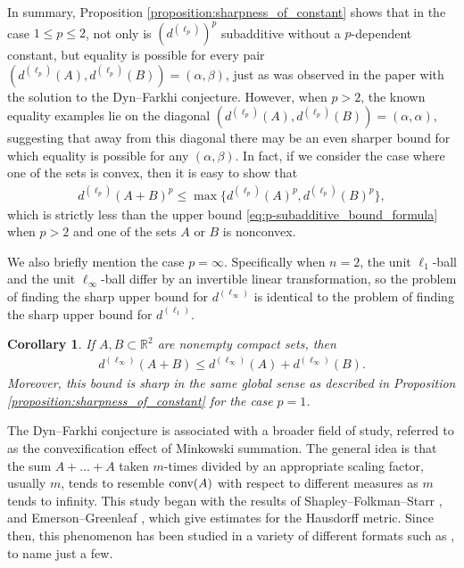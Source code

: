 \documentclass[11pt]{article}
\newtheorem{corollary}{Corollary}[section]
\begin{document}
In summary, Proposition \ref{proposition:sharpness_of_constant} shows that in the case $1\leq p\leq 2$, not only is $(d^{(\ell_p)})^p$ subadditive without a $p$-dependent constant, but equality is possible for every pair $(d^{(\ell_p)}(A),d^{(\ell_p)}(B))=(\alpha,\beta)$, just as was observed in the paper \cite{meyer2} with the solution to the Dyn--Farkhi conjecture. However, when $p>2$, the known equality examples lie on the diagonal $(d^{(\ell_p)}(A),d^{(\ell_p)}(B))=(\alpha,\alpha)$, suggesting that away from this diagonal there may be an even sharper bound for which equality is possible for any $(\alpha,\beta)$. In fact, if we consider the case where one of the sets is convex, then it is easy to show that 
\begin{align*}
    d^{(\ell_p)}(A+B)^p\leq \max\{d^{(\ell_p)}(A)^p,d^{(\ell_p)}(B)^p\},
\end{align*}
which is strictly less than the upper bound \eqref{eq:p-subadditive_bound_formula} when $p>2$ and one of the sets $A$ or $B$ is nonconvex.

We also briefly mention the case $p=\infty$. Specifically when $n=2$, the unit $\ell_1$-ball and the unit $\ell_{\infty}$-ball differ by an invertible linear transformation, so the problem of finding the sharp upper bound for $d^{(\ell_{\infty})}$ is identical to the problem of finding the sharp upper bound for $d^{(\ell_1)}$.

\begin{corollary}\label{l_infty_bound}
    If $A,B\subset\mathbb{R}^2$ are nonempty compact sets, then
    \begin{align*}
        d^{(\ell_{\infty})}(A+B)\leq d^{(\ell_{\infty})}(A)+d^{(\ell_{\infty})}(B).
    \end{align*}
    Moreover, this bound is sharp in the same global sense as described in Proposition \ref{proposition:sharpness_of_constant} for the case $p=1$.
\end{corollary}

The Dyn--Farkhi conjecture is associated with a broader field of study, referred to as the convexification effect of Minkowski summation. The general idea is that the sum $A+\dots+A$ taken $m$-times divided by an appropriate scaling factor, usually $m$, tends to resemble $\textup{conv}(A)$ with respect to different measures as $m$ tends to infinity. This study began with the results of Shapley--Folkman--Starr \cite{starr1}, and Emerson--Greenleaf \cite{emerson1}, which give estimates for the Hausdorff metric. Since then, this phenomenon has been studied in a variety of different formats such as \cite{schneider1,cassels1,wegmann1,fradelizi1,FMMZ-2016,vHST-2020,A-2021,AK-2025,FLZ-2022}, to name just a few.
\end{document}

